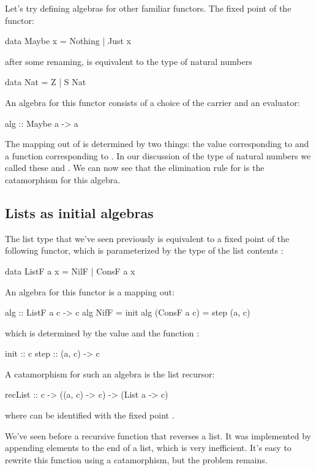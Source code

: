\documentclass[DaoFP]{subfiles}
\begin{document}
Let's try defining algebras for other familiar functors. The fixed point of the  functor:
\begin{haskell}
data Maybe x = Nothing | Just x
\end{haskell}
after some renaming, is equivalent to the type of natural numbers
\begin{haskell}
data Nat = Z | S Nat
\end{haskell}
An algebra for this functor consists of a choice of the carrier  and an evaluator:
\begin{haskell}
alg :: Maybe a -> a
\end{haskell}
The mapping out of  is determined by two things: the value corresponding to  and a function  corresponding to . In our discussion of the type of natural numbers we called these  and . We can now see that the elimination rule for  is the catamorphism for this algebra.

\subsection{Lists as initial algebras}

The list type that we've seen previously is equivalent to a fixed point of the following functor, which is parameterized by the type of the list contents :
\begin{haskell}
data ListF a x = NilF | ConsF a x
\end{haskell}
An algebra for this functor is a mapping out:
\begin{haskell}
alg :: ListF a c -> c
alg NifF = init
alg (ConsF a c) = step (a, c)
\end{haskell}
which is determined by the value  and the function :
\begin{haskell}
init :: c
step :: (a, c) -> c
\end{haskell}
A catamorphism for such an algebra is the list recursor:
\begin{haskell}
recList :: c -> ((a, c) -> c) -> (List a -> c)
\end{haskell}
where  can be identified with the fixed point .

We've seen before a recursive function that reverses a list. It was implemented by appending elements to the end of a list, which is very inefficient. It's easy to rewrite this function using a catamorphism, but the problem remains. 
\end{document}
